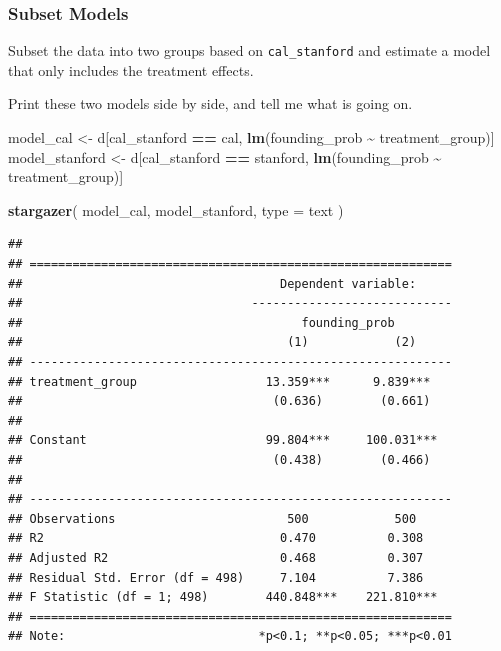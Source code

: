 \documentclass[
]{article}
\newenvironment{Shaded}{\begin{snugshade}}{\end{snugshade}}
\newcommand{\AttributeTok}[1]{\textcolor[rgb]{0.13,0.29,0.53}{#1}}
\newcommand{\FunctionTok}[1]{\textcolor[rgb]{0.13,0.29,0.53}{\textbf{#1}}}
\newcommand{\NormalTok}[1]{#1}
\newcommand{\OtherTok}[1]{\textcolor[rgb]{0.56,0.35,0.01}{#1}}
\newcommand{\SpecialCharTok}[1]{\textcolor[rgb]{0.81,0.36,0.00}{\textbf{#1}}}
\newcommand{\StringTok}[1]{\textcolor[rgb]{0.31,0.60,0.02}{#1}}
\theoremstyle{definition}
\theoremstyle{definition}
\theoremstyle{definition}
\theoremstyle{definition}
\theoremstyle{remark}
\begin{document}
\subsubsection{Subset Models}\label{subset-models}

Subset the data into two groups based on \texttt{cal\_stanford} and estimate
a model that only includes the treatment effects.

Print these two models side by side, and tell me what is going
on.

\begin{Shaded}
\begin{Highlighting}[]
\NormalTok{model\_cal      }\OtherTok{\textless{}{-}}\NormalTok{ d[cal\_stanford }\SpecialCharTok{==} \StringTok{\textquotesingle{}cal\textquotesingle{}}\NormalTok{, }\FunctionTok{lm}\NormalTok{(founding\_prob }\SpecialCharTok{\textasciitilde{}}\NormalTok{ treatment\_group)]}
\NormalTok{model\_stanford }\OtherTok{\textless{}{-}}\NormalTok{ d[cal\_stanford }\SpecialCharTok{==} \StringTok{\textquotesingle{}stanford\textquotesingle{}}\NormalTok{, }\FunctionTok{lm}\NormalTok{(founding\_prob }\SpecialCharTok{\textasciitilde{}}\NormalTok{ treatment\_group)]}

\FunctionTok{stargazer}\NormalTok{(}
\NormalTok{  model\_cal, model\_stanford, }
  \AttributeTok{type =} \StringTok{\textquotesingle{}text\textquotesingle{}}
\NormalTok{)}
\end{Highlighting}
\end{Shaded}

\begin{verbatim}
## 
## ===========================================================
##                                    Dependent variable:     
##                                ----------------------------
##                                       founding_prob        
##                                     (1)            (2)     
## -----------------------------------------------------------
## treatment_group                  13.359***      9.839***   
##                                   (0.636)        (0.661)   
##                                                            
## Constant                         99.804***     100.031***  
##                                   (0.438)        (0.466)   
##                                                            
## -----------------------------------------------------------
## Observations                        500            500     
## R2                                 0.470          0.308    
## Adjusted R2                        0.468          0.307    
## Residual Std. Error (df = 498)     7.104          7.386    
## F Statistic (df = 1; 498)        440.848***    221.810***  
## ===========================================================
## Note:                           *p<0.1; **p<0.05; ***p<0.01
\end{verbatim}
\end{document}
